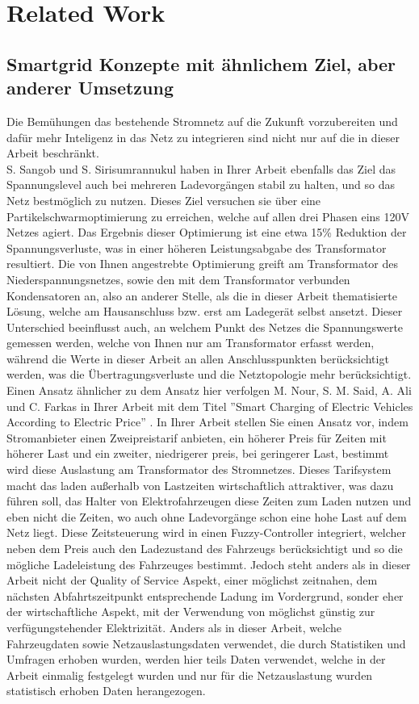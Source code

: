 \chapter{Related Work}

\section{Smartgrid Konzepte mit ähnlichem Ziel, aber anderer Umsetzung}
Die Bemühungen das bestehende Stromnetz auf die Zukunft vorzubereiten und dafür mehr Inteligenz in das Netz zu integrieren sind nicht nur auf die in dieser Arbeit beschränkt. \\
S. Sangob und S. Sirisumrannukul \citet{RW_1_1} haben in Ihrer Arbeit ebenfalls das Ziel das Spannungslevel auch bei mehreren Ladevorgängen stabil zu halten, und so das Netz bestmöglich zu nutzen. Dieses Ziel versuchen sie über eine Partikelschwarmoptimierung zu erreichen, welche auf allen drei Phasen eins 120V Netzes agiert. Das Ergebnis dieser Optimierung ist eine etwa 15\% Reduktion der Spannungsverluste, was in einer höheren Leistungsabgabe des Transformator resultiert. Die von Ihnen angestrebte Optimierung greift  am Transformator des Niederspannungsnetzes, sowie den mit dem Transformator verbunden Kondensatoren an, also an anderer Stelle, als die in dieser Arbeit thematisierte Lösung, welche am Hausanschluss bzw. erst am Ladegerät selbst ansetzt. Dieser Unterschied beeinflusst auch, an welchem Punkt des Netzes die Spannungswerte gemessen werden, welche von Ihnen nur am Transformator erfasst werden, während die Werte in dieser Arbeit an allen Anschlusspunkten berücksichtigt werden, was die Übertragungsverluste und die Netztopologie mehr berücksichtigt.
\\
Einen Ansatz ähnlicher zu dem Ansatz hier verfolgen M. Nour, S. M. Said, A. Ali und C. Farkas in Ihrer Arbeit mit dem Titel ''Smart Charging of Electric Vehicles According to Electric Price'' \cite{RW_2_1}. In Ihrer Arbeit stellen Sie einen Ansatz vor, indem Stromanbieter einen Zweipreistarif anbieten, ein höherer Preis für Zeiten mit höherer Last und ein zweiter, niedrigerer preis, bei geringerer Last, bestimmt wird diese Auslastung am Transformator des Stromnetzes. Dieses Tarifsystem macht das laden außerhalb von Lastzeiten wirtschaftlich attraktiver, was dazu führen soll, das Halter von Elektrofahrzeugen diese Zeiten zum Laden nutzen und eben nicht die Zeiten, wo auch ohne Ladevorgänge schon eine hohe Last auf dem Netz liegt. Diese Zeitsteuerung wird in einen Fuzzy-Controller integriert, welcher neben dem Preis auch den Ladezustand des Fahrzeugs berücksichtigt und so die mögliche Ladeleistung des Fahrzeuges bestimmt. Jedoch steht anders als in dieser Arbeit nicht der Quality of Service Aspekt, einer möglichst zeitnahen,  dem nächsten Abfahrtszeitpunkt entsprechende Ladung im Vordergrund, sonder eher der wirtschaftliche Aspekt, mit der Verwendung von möglichst günstig zur verfügungstehender Elektrizität. Anders als in dieser Arbeit, welche Fahrzeugdaten sowie Netzauslastungsdaten verwendet, die durch Statistiken und Umfragen erhoben wurden, werden hier teils Daten verwendet, welche in der Arbeit einmalig festgelegt wurden und nur für die Netzauslastung wurden statistisch erhoben Daten herangezogen. 

